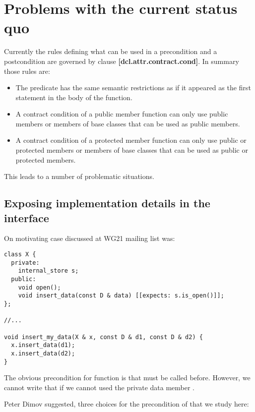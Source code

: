 \section{Problems with the current status quo}

Currently the rules defining what can be used in a precondition and a
postcondition are governed by clause \textbf{[dcl.attr.contract.cond]}.
In summary those rules are:

\begin{itemize}

\item The predicate has the same semantic restrictions as if it appeared as the
first statement in the body of the function.

\item A contract condition of a public member function can only use public
members or members of base classes that can be used as public members.

\item A contract condition of a protected member function can only use public or
protected members or members of base classes that can be used as public or
protected members.

\end{itemize}

This leads to a number of problematic situations.

\subsection{Exposing implementation details in the interface}

On motivating case discussed at WG21 mailing list was:

\begin{lstlisting}
class X {
  private:
    internal_store s;
  public:
    void open();
    void insert_data(const D & data) [[expects: s.is_open()]];
};

//...

void insert_my_data(X & x, const D & d1, const D & d2) {
  x.insert_data(d1);
  x.insert_data(d2);
}
\end{lstlisting}

The obvious precondition for function  is that
 must be called before. However, we cannot write that if we
cannot used the private data member .

Peter Dimov suggested, three choices for the precondition of
 that we study here:

